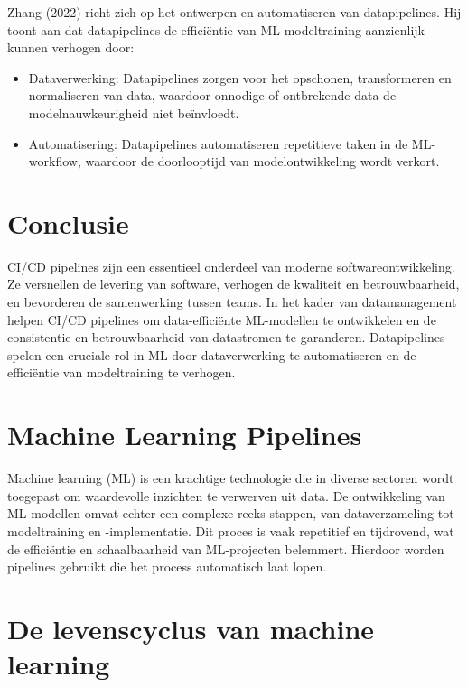 Zhang (2022) richt zich op het ontwerpen en automatiseren van datapipelines. Hij toont aan dat datapipelines de efficiëntie van ML-modeltraining aanzienlijk kunnen verhogen door:

\begin{itemize}
    \item Dataverwerking: Datapipelines zorgen voor het opschonen, transformeren en normaliseren van data, waardoor onnodige of ontbrekende data de modelnauwkeurigheid niet beïnvloedt.
    \item Automatisering: Datapipelines automatiseren repetitieve taken in de ML-workflow, waardoor de doorlooptijd van modelontwikkeling wordt verkort.
\end{itemize}

\section{Conclusie}

CI/CD pipelines zijn een essentieel onderdeel van moderne softwareontwikkeling. Ze versnellen de levering van software, verhogen de kwaliteit en betrouwbaarheid, en bevorderen de samenwerking tussen teams. In het kader van datamanagement helpen CI/CD pipelines om data-efficiënte ML-modellen te ontwikkelen en de consistentie en betrouwbaarheid van datastromen te garanderen. Datapipelines spelen een cruciale rol in ML door dataverwerking te automatiseren en de efficiëntie van modeltraining te verhogen.
\section{Machine Learning Pipelines}

Machine learning (ML) is een krachtige technologie die in diverse sectoren wordt toegepast om waardevolle inzichten te verwerven uit data. De ontwikkeling van ML-modellen omvat echter een complexe reeks stappen, van dataverzameling tot modeltraining en -implementatie. Dit proces is vaak repetitief en tijdrovend, wat de efficiëntie en schaalbaarheid van ML-projecten belemmert. Hierdoor worden pipelines gebruikt die het process automatisch laat lopen.

\section{De levenscyclus van machine learning}

